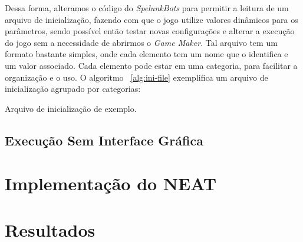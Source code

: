 Dessa forma, alteramos o código do \textit{SpelunkBots} para permitir a leitura
de um arquivo de inicialização, fazendo com que o jogo utilize valores dinâmicos para os
parâmetros, sendo possível então testar novas configurações e alterar a
execução do jogo sem a necessidade de abrirmos o \textit{Game Maker}. Tal
arquivo tem um formato bastante simples, onde cada elemento tem um nome que o
identifica e um valor associado. Cada elemento pode estar em uma categoria,
para facilitar a organização e o uso. O algoritmo ~\ref{alg:ini-file}
exemplifica um arquivo de inicialização agrupado por categorias:

\begin{algorithm}[H]

\caption[Arquivo de inicialização de exemplo.]
{\label{alg:ini-file}Arquivo de inicialização de exemplo.}
\end{algorithm}

\subsection{Execução Sem Interface Gráfica}

\section{\label{section:neat-details}Implementação do NEAT}


\section{\label{section:results}Resultados}


